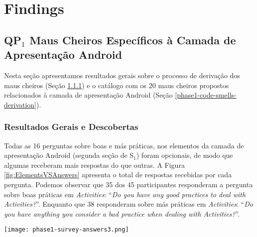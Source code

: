 \section{Findings}

\subsection{QP$_1$ Maus Cheiros Específicos à Camada de Apresentação Android} 
\label{phase1-results}


Nesta seção apresentamos resultados gerais sobre o processo de derivação dos maus cheiros (Seção \ref{phase1-general-results}) e o catálogo com os 20 maus cheiros propostos relacionados à camada de apresentação Android (Seção \ref{phase1-code-smells-derivation}).

\subsubsection{Resultados Gerais e Descobertas}
\label{phase1-general-results}

Todas as 16 perguntas sobre boas e más práticas, nos elementos da camada de apresentação Android (segunda seção de S$_1$) foram opcionais, de modo que algumas receberam mais respostas do que outras. A Figura \ref{fig:ElementsVSAnswers} apresenta o total de respostas recebidas por cada pergunta. Podemos observar que 35 dos 45 participantes responderam a pergunta sobre boas práticas em \textit{Activities}: ``\textit{Do you have any good practices to deal with Activities?}''. Enquanto que 38 responderam sobre más práticas em \textit{Activities}: ``\textit{Do you have anything you consider a bad practice when dealing with Activities?}''. 

\begin{figure*}[!htb]
\centering
\texttt{[image: phase1-survey-answers3.png]}
\caption{Total de respostas para cada pergunta sobre boas e más práticas nos oito elementos da camada de apresentação Android.}
\label{fig:ElementsVSAnswers}
\end{figure*}

